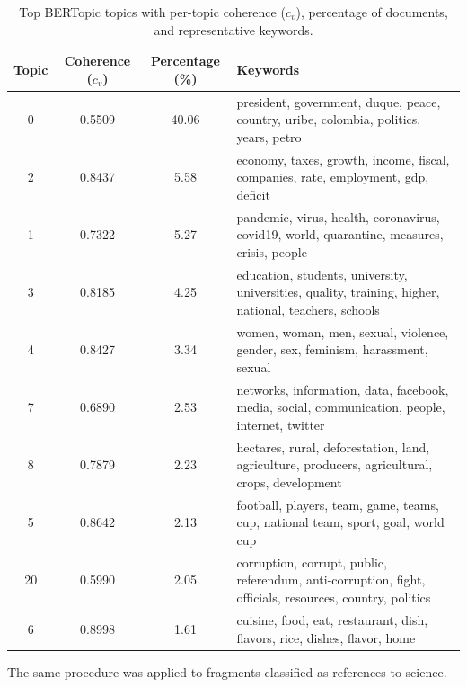 \documentclass[11pt,a4paper]{article}
\begin{document}
\begin{table}[H]
	\centering
	\small
	\caption{Top BERTopic topics with per-topic coherence ($c_v$), percentage of documents, and representative keywords.}
	\begin{tabularx}{\textwidth}{c c c X}
		\hline
		\textbf{Topic} & \textbf{Coherence ($c_v$)} & \textbf{Percentage (\%)} & \textbf{Keywords} \\
		\hline
		0  & 0.5509 & 40.06 & president, government, duque, peace, country, uribe, colombia, politics, years, petro \\
		2  & 0.8437 & 5.58  & economy, taxes, growth, income, fiscal, companies, rate, employment, gdp, deficit \\
		1  & 0.7322 & 5.27  & pandemic, virus, health, coronavirus, covid19, world, quarantine, measures, crisis, people \\
		3  & 0.8185 & 4.25  & education, students, university, universities, quality, training, higher, national, teachers, schools \\
		4  & 0.8427 & 3.34  & women, woman, men, sexual, violence, gender, sex, feminism, harassment, sexual \\
		7  & 0.6890 & 2.53  & networks, information, data, facebook, media, social, communication, people, internet, twitter \\
		8  & 0.7879 & 2.23  & hectares, rural, deforestation, land, agriculture, producers, agricultural, crops, development \\
		5  & 0.8642 & 2.13  & football, players, team, game, teams, cup, national team, sport, goal, world cup \\
		20 & 0.5990 & 2.05  & corruption, corrupt, public, referendum, anti-corruption, fight, officials, resources, country, politics \\
		6  & 0.8998 & 1.61  & cuisine, food, eat, restaurant, dish, flavors, rice, dishes, flavor, home \\
		\hline
	\end{tabularx}
	
	\label{tab:bertopic_coherence_top}
\end{table}
		
		The same procedure was applied to fragments classified as references to science. 
		
\end{document}
